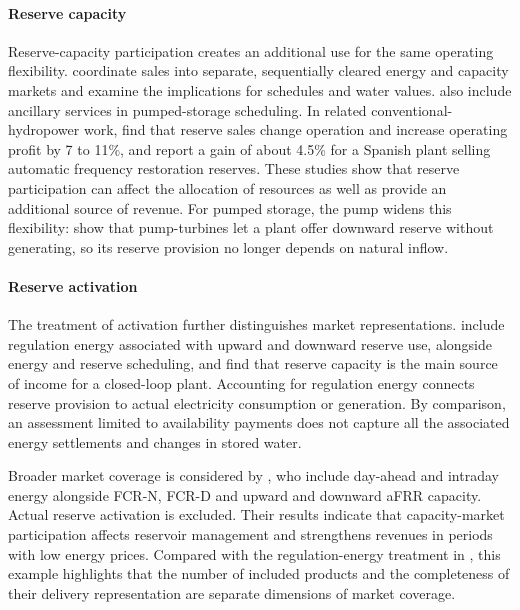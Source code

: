 \paragraph{Reserve capacity}
Reserve-capacity participation creates an additional use for the same
operating flexibility. \citet{helseth2016} coordinate sales into
separate, sequentially cleared energy and capacity markets and examine
the implications for schedules and water values.
\citet{abgottspon2014} also include ancillary services in
pumped-storage scheduling. In related conventional-hydropower work,
\citet{helseth2017iet} find that reserve sales change operation and
increase operating profit by 7 to 11\%, and \citet{perezdiaz2020medium}
report a gain of about 4.5\% for a Spanish plant selling automatic
frequency restoration reserves. These studies show that reserve
participation can affect the allocation of resources as well as provide
an additional source of revenue. For pumped storage, the pump widens
this flexibility: \citet{dallinger2019socioeconomic} show that
pump-turbines let a plant offer downward reserve without generating, so
its reserve provision no longer depends on natural inflow.

\paragraph{Reserve activation}
The treatment of activation further distinguishes market
representations. \citet{chazarra2017} include regulation energy
associated with upward and downward reserve use, alongside energy and
reserve scheduling, and find that reserve capacity is the main source of
income for a closed-loop plant. Accounting for regulation energy
connects reserve provision to actual electricity consumption or
generation. By comparison, an assessment limited to availability
payments does not capture all the associated energy settlements and
changes in stored water.

Broader market coverage is considered by \citet{bore2026assessing}, who
include day-ahead and intraday energy alongside FCR-N, FCR-D and upward
and downward aFRR capacity. Actual reserve activation is excluded. Their
results indicate that capacity-market participation affects reservoir
management and strengthens revenues in periods with low energy prices.
Compared with the regulation-energy treatment in \citet{chazarra2017},
this example highlights that the number of included products and the
completeness of their delivery representation are separate dimensions
of market coverage.

